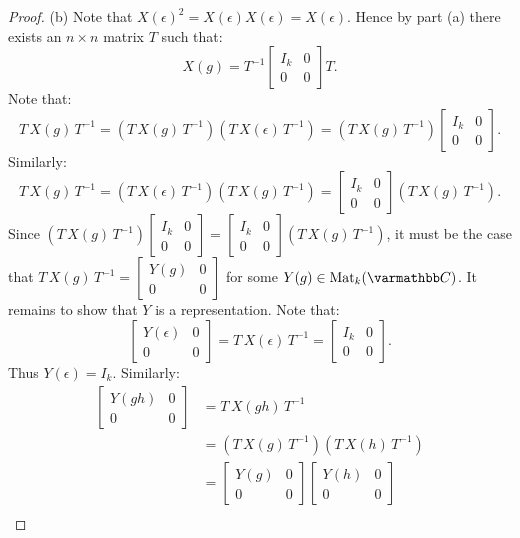 \begin{proof}
		(b) Note that $X(\epsilon)^2 = X(\epsilon)X(\epsilon) = X(\epsilon)$. Hence by part (a) there exists an $n \times n$ matrix $T$ such that:
		\[
			X(g) = T^{-1}\begin{bmatrix} I_k & 0 \\ 0 & 0 \end{bmatrix} T.
		\]
		Note that:
		\[
			T\,X(g)\,T^{-1} = (T\,X(g)\,T^{-1})(T\,X(\epsilon)\,T^{-1}) = (T\,X(g)\,T^{-1}) \begin{bmatrix} I_k & 0 \\ 0 & 0 \end{bmatrix}.
		\]
		Similarly:
		\[
			T\,X(g)\,T^{-1} = (T\,X(\epsilon)\,T^{-1})(T\,X(g)\,T^{-1}) = \begin{bmatrix} I_k & 0 \\ 0 & 0 \end{bmatrix} (T\,X(g)\,T^{-1}).
		\]
		Since $(T\,X(g)\,T^{-1}) \begin{bmatrix} I_k & 0 \\ 0 & 0 \end{bmatrix} = \begin{bmatrix} I_k & 0 \\ 0 & 0 \end{bmatrix} (T\,X(g)\,T^{-1})$, it must be the case that $T\,X(g)\,T^{-1} = \begin{bmatrix} Y(g) & 0 \\ 0 & 0 \end{bmatrix} $ for some $Y(g) \in \Mat_k(\bfC)$. It remains to show that $Y$ is a representation. Note that:
		\[
			\begin{bmatrix} Y(\epsilon) & 0 \\ 0 & 0 \end{bmatrix} = T\,X(\epsilon)\,T^{-1} = \begin{bmatrix} I_k & 0 \\ 0 & 0 \end{bmatrix}.
		\] 
		Thus $Y(\epsilon) = I_k$. Similarly:
		\begin{align*}
			\begin{bmatrix} Y(gh) & 0 \\ 0 & 0 \end{bmatrix} 
			&= T\,X(gh)\,T^{-1} \\
			&= (T\,X(g)\,T^{-1})(T\,X(h)\,T^{-1}) \\
			&= \begin{bmatrix} Y(g) & 0 \\ 0 & 0 \end{bmatrix} \begin{bmatrix} Y(h) & 0 \\ 0 & 0 \end{bmatrix} \\

\end{align*}
\end{proof}
